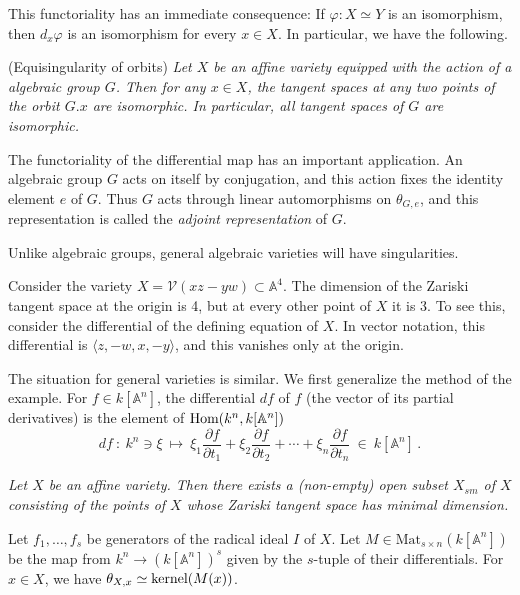 \documentclass[12pt]{amsart}
\begin{document}
This functoriality has an immediate consequence:
If $\varphi\colon X\simeq Y$ is an isomorphism, then 
$d_x\varphi$ is an isomorphism for every $x\in X$.
In particular, we have the following.\medskip

(Equisingularity of orbits)
{\it
Let $X$ be an affine variety equipped with the action of a algebraic group
$G$.
Then for any $x\in X$, the tangent spaces at any two points of the orbit
$G.x$ are isomorphic.
In particular, all tangent spaces of $G$ are isomorphic.
}\medskip

The functoriality of the differential map has an important application.
An algebraic group $G$ acts on itself by conjugation, and this action fixes
the identity element $e$ of $G$.
Thus $G$ acts through linear automorphisms on $\theta_{G,e}$, and this
representation is called the {\sl adjoint representation} of $G$.
\medskip

Unlike algebraic groups, general algebraic varieties will have
singularities.\medskip

Consider the variety $X={\mathcal V}(xz-yw)\subset{\mathbb A}^4$.
The dimension of the Zariski tangent space at the origin is 4, but at every
other point of $X$ it is 3.
To see this, consider the differential of the defining equation of $X$.
In vector notation, this differential is
$\langle z, -w, x, -y\rangle$,
and this vanishes only at the origin.\medskip

The situation for general varieties is similar.
We first generalize the method of the example.
For $f\in k[{\mathbb A}^n]$, the differential $df$ of $f$
(the vector of its partial derivatives) is the element of
$\mbox{\rm Hom}(k^n,k[{\mathbb A}^n])$
$$
   df\ :\ k^n\ni \xi\ \longmapsto\ 
    \xi_1\frac{\partial f}{\partial t_1}+
    \xi_2\frac{\partial f}{\partial t_2}+ \cdots +
    \xi_n\frac{\partial f}{\partial t_n}\ \in\ 
    k[{\mathbb A}^n]\,.
$$


{\it
Let $X$ be an affine variety.
Then there exists a (non-empty) open subset $X_{sm}$ of $X$ consisting of
the points of $X$ whose Zariski tangent space has minimal
dimension.}\medskip

Let $f_1,\ldots,f_s$ be generators of the radical ideal $I$ of $X$.
Let $M\in\mbox{Mat}_{s\times n}(k[{\mathbb A}^n])$ be the map from 
$k^n\to (k[{\mathbb A}^n])^s$ given by the $s$-tuple of their
differentials. 
For $x\in X$, we have $\theta_{X,x}\simeq \mbox{\rm kernel}(M(x))$.
\end{document}
